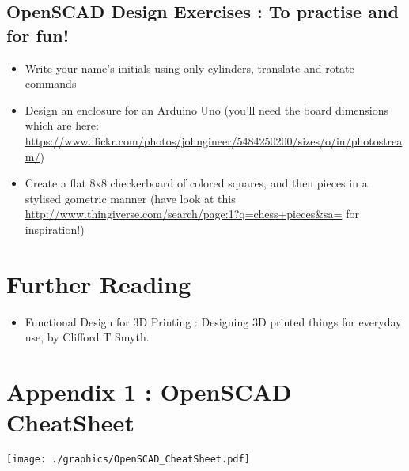 \newpage
\subsection{OpenSCAD Design Exercises : To practise and for fun! }

\begin{itemize}
 \item Write your name's initials using only cylinders, translate and rotate commands 
 \item Design an enclosure for an Arduino Uno (you'll need the board dimensions which are here: \url{https://www.flickr.com/photos/johngineer/5484250200/sizes/o/in/photostream/}) 
 \item Create a flat 8x8 checkerboard of colored squares, and then pieces in a stylised gometric manner (have look at this \url{http://www.thingiverse.com/search/page:1?q=chess+pieces&sa=} for inspiration!)
\end{itemize}

\newpage
\section{Further Reading}

\begin{itemize}
 \item Functional Design for 3D Printing : Designing 3D printed things for everyday use, by Clifford T Smyth. 
\end{itemize}


\section{Appendix 1 : OpenSCAD CheatSheet}%

\begin{fullwidth}
  \parbox[c][\textwidth][s]{\textheight}{%
  \texttt{[image: ./graphics/OpenSCAD\_CheatSheet.pdf]}
} 
\end{fullwidth}


